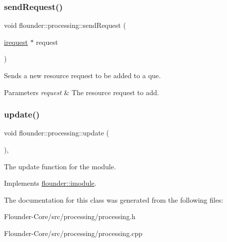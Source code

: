 \subsubsection{\texorpdfstring{send\+Request()}{sendRequest()}}
{\footnotesize\ttfamily void flounder\+::processing\+::send\+Request (\begin{DoxyParamCaption}\item[{\hyperlink{classflounder_1_1irequest}{irequest} $\ast$}]{request }\end{DoxyParamCaption})}



Sends a new resource request to be added to a que. 


\begin{DoxyParams}{Parameters}
{\em request} & The resource request to add. \\
\hline
\end{DoxyParams}
\mbox{\label{classflounder_1_1processing_ac096299eb1b5b67739586900710d4206}} 
\subsubsection{\texorpdfstring{update()}{update()}}
{\footnotesize\ttfamily void flounder\+::processing\+::update (\begin{DoxyParamCaption}{ }\end{DoxyParamCaption})\hspace{0.3cm}{\ttfamily [override]}, {\ttfamily [virtual]}}



The update function for the module. 



Implements \hyperlink{classflounder_1_1imodule_a9a53d48a46b5f6b16a92b2cd8503f74a}{flounder\+::imodule}.



The documentation for this class was generated from the following files\+:\begin{DoxyCompactItemize}
\item 
Flounder-\/\+Core/src/processing/processing.\+h\item 
Flounder-\/\+Core/src/processing/processing.\+cpp\end{DoxyCompactItemize}

